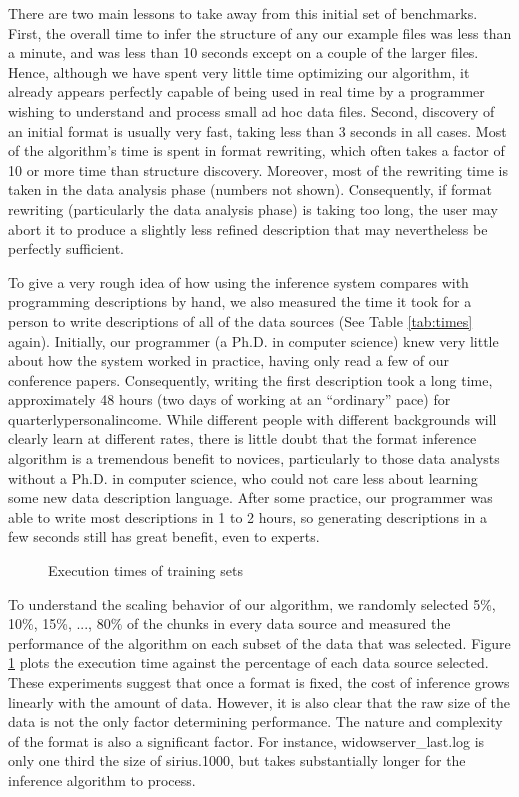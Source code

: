 There are two main lessons to take away from this initial set of
benchmarks.  First, the overall time to infer the structure of any our
example files was less than a minute, and was less than 10 seconds
except on a couple of the larger files.  Hence, although we have spent
very little time optimizing our algorithm, it already appears
perfectly capable of being used in real time by a programmer wishing
to understand and process small ad hoc data files.  Second, discovery
of an initial format is usually very fast, taking less than 3 seconds
in all cases.  Most of the algorithm's time is spent in format rewriting, which
often takes a factor of 10 or more time than structure discovery.  Moreover, most of the
rewriting time is taken in the data analysis phase (numbers not
shown).  Consequently, if format rewriting (particularly the data analysis phase)
is taking too long, the user may abort it to produce a 
slightly less refined description that may nevertheless be perfectly sufficient.

To give a very rough idea of how using the inference system compares with programming
descriptions by hand, we also measured the time it took for a person to write descriptions of
all of the data sources (See Table \ref{tab:times} again).  
Initially, our programmer (a Ph.D. in computer science)
knew very little about how the \pads{} system
worked in practice, having only read a few of our conference papers.  Consequently, writing
the first description took a long time, approximately 48 hours (two days of working at
an ``ordinary'' pace) for quarterlypersonalincome.  While different people with different 
backgrounds will clearly learn at different rates, there is little doubt that the
format inference algorithm is a tremendous benefit to novices, particularly
to those data analysts without a Ph.D. in computer science, who could not care less about
learning some new data description language.  After some practice, our programmer was
able to write most descriptions in 1 to 2 hours, so generating descriptions in a few
seconds still has great benefit, even to experts.

\begin{figure}
\caption{Execution times of training sets} \label{fig:traintime} \shrink
\end{figure}

To understand the scaling behavior of our algorithm, we
randomly selected 5\%, 10\%, 15\%, ..., 80\% of the chunks in every data source
and measured the performance of the algorithm on each subset of the data that was
selected. Figure \ref{fig:traintime}
plots the execution time against the percentage of each data source selected.
These experiments suggest that once a format is fixed, the cost of inference
grows linearly with the amount of data.  However, it is also clear that the raw
size of the data is not the only factor determining performance.  The nature and complexity
of the format is also a significant factor.  For instance, widowserver\_last.log
is only one third the size of sirius.1000, but takes substantially longer 
for the inference algorithm to process.

